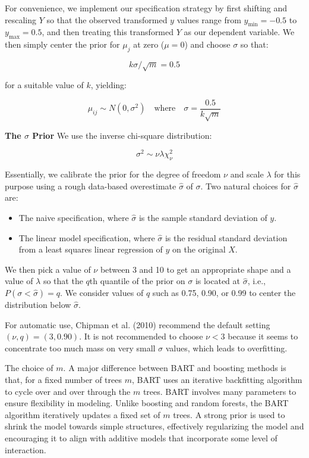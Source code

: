 \documentclass[a4paper,11pt]{article}
\begin{document}
For convenience, we implement our specification strategy by first shifting and rescaling \(Y\) so that the observed transformed \(y\) values range from \(y_{\text{min}} = -0.5\) to \(y_{\text{max}} = 0.5\), and then treating this transformed \(Y\) as our dependent variable. We then simply center the prior for \(\mu_j\) at zero (\(\mu = 0\)) and choose \(\sigma\) so that:

\[
k \sigma / \sqrt{m} = 0.5
\]

for a suitable value of \(k\), yielding:

\[
\mu_{ij} \sim N(0, \sigma^2) \quad \text{where} \quad \sigma = \frac{0.5}{k \sqrt{m}}
\]


\textbf{The \( \sigma \) Prior}
We use the inverse chi-square distribution:

\[
\sigma^2 \sim \nu \lambda \chi^2_\nu
\]

Essentially, we calibrate the prior for the degree of freedom \( \nu \) and scale \( \lambda \) for this purpose using a rough data-based overestimate \( \hat{\sigma} \) of \( \sigma \). Two natural choices for \( \hat{\sigma} \) are:

\begin{itemize}
    \item The naive specification, where \( \hat{\sigma} \) is the sample standard deviation of \( y \).
    \item The linear model specification, where \( \hat{\sigma} \) is the residual standard deviation from a least squares linear regression of \( y \) on the original \( X \).
\end{itemize}

We then pick a value of \( \nu \) between 3 and 10 to get an appropriate shape and a value of \( \lambda \) so that the \( q \)th quantile of the prior on \( \sigma \) is located at \( \hat{\sigma} \), i.e., \( P(\sigma < \hat{\sigma}) = q \). We consider values of \( q \) such as 0.75, 0.90, or 0.99 to center the distribution below \( \hat{\sigma} \).

For automatic use, Chipman et al. (2010) recommend the default setting \( (\nu, q) = (3, 0.90) \). It is not recommended to choose \( \nu < 3 \) because it seems to concentrate too much mass on very small \( \sigma \) values, which leads to overfitting.

The choice of \(m\). A major difference between BART and boosting methods is that, for a fixed number of trees \(m\), BART uses an iterative backfitting algorithm to cycle over and over through the \(m\) trees.
BART involves many parameters to ensure flexibility in modeling. Unlike boosting and random forests, the BART algorithm iteratively updates a fixed set of \(m\) trees. A strong prior is used to shrink the model towards simple structures, effectively regularizing the model and encouraging it to align with additive models that incorporate some level of interaction.
\end{document}
